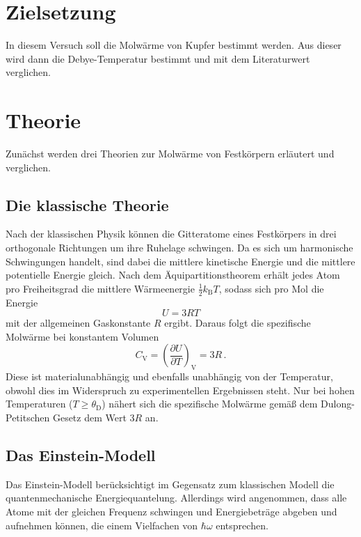 \section{Zielsetzung}
In diesem Versuch soll die Molwärme von Kupfer bestimmt werden. Aus dieser wird
dann die Debye-Temperatur bestimmt und mit dem Literaturwert verglichen.

\section{Theorie}
Zunächst werden drei Theorien zur Molwärme von Festkörpern erläutert und verglichen.
\subsection{Die klassische Theorie}
Nach der klassischen Physik können die Gitteratome eines Festkörpers in drei orthogonale
Richtungen um ihre Ruhelage schwingen. Da es sich um harmonische Schwingungen handelt, sind
dabei die mittlere kinetische Energie und die mittlere potentielle Energie gleich. Nach dem
Äquipartitionstheorem erhält jedes Atom pro Freiheitsgrad die mittlere Wärmeenergie $\frac{1}{2}k_\text{B}T$,
sodass sich pro Mol die Energie
\begin{equation}
  U = 3RT
\end{equation}
mit der allgemeinen Gaskonstante $R$ ergibt. Daraus folgt die spezifische Molwärme bei konstantem Volumen
\begin{equation}
  C_\text{V} = \left(\frac{\partial U}{\partial T}\right)_\text{V} = 3R \,.
\end{equation}
Diese ist materialunabhängig und ebenfalls unabhängig von der Temperatur, obwohl dies im Widerspruch zu experimentellen
Ergebnissen steht. Nur bei hohen Temperaturen ($T \geq \theta_\text{D}$) nähert sich die spezifische Molwärme gemäß
dem Dulong-Petitschen Gesetz dem Wert $3R$ an.

\subsection{Das Einstein-Modell}
Das Einstein-Modell berücksichtigt im Gegensatz zum klassischen Modell die quantenmechanische Energiequantelung. Allerdings
wird angenommen, dass alle Atome mit der gleichen Frequenz schwingen und Energiebeträge abgeben und aufnehmen können, die einem
Vielfachen von $\hbar\omega$ entsprechen.

